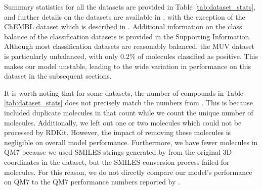 \documentclass[journal=jcisd8,manuscript=article]{achemso}
\begin{document}
Summary statistics for all the datasets are provided in Table \ref{tab:dataset_stats}, and further details on the datasets are available in \citeauthor{Wu_2018}\cite{Wu_2018}, with the exception of the ChEMBL dataset which is described in \citeauthor{mayr2018chembl}\cite{mayr2018chembl}. Additional information on the class balance of the classification datasets is provided in the Supporting Information. Although most classification datasets are reasonably balanced, the MUV dataset is particularly unbalanced, with only 0.2\% of molecules classified as positive. This makes our model unstable, leading to the wide variation in performance on this dataset in the subsequent sections.

It is worth noting that for some datasets, the number of compounds in Table \ref{tab:dataset_stats} does not precisely match the numbers from \citeauthor{Wu_2018}\cite{Wu_2018}. This is because \citeauthor{Wu_2018}\cite{Wu_2018} included duplicate molecules in that count while we count the unique number of molecules. Additionally, we left out one or two molecules which could not be processed by RDKit\cite{landrum2006rdkit}. However, the impact of removing these molecules is negligible on overall model performance. Furthermore, we have fewer molecules in QM7 because we used SMILES strings generated by \citeauthor{Wu_2018}\cite{Wu_2018} from the original 3D coordinates in the dataset, but the SMILES conversion process failed for  molecules. For this reason, we do not directly compare our model's performance on QM7 to the QM7 performance numbers reported by \citeauthor{Wu_2018}\cite{Wu_2018}.

\FloatBarrier
\end{document}

